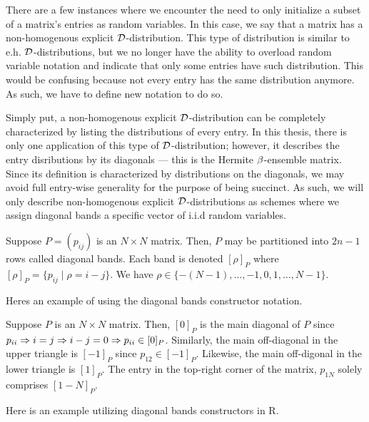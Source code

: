 
There are a few instances where we encounter the need to only initialize a subset of a matrix's entries as random variables. In this case, we say that a matrix has a non-homogenous explicit $\mathcal{D}$-distribution.
This type of distribution is similar to e.h. $\mathcal{D}$-distributions, but we no longer have the ability to overload random variable notation and indicate that only some entries have such distribution. This would be
confusing because not every entry has the same distribution anymore. As such, we have to define new notation to do so.

Simply put, a non-homogenous explicit $\mathcal{D}$-distribution can be completely characterized by listing the distributions of every entry.
In this thesis, there is only one application of this type of $\mathcal{D}$-distribution; however, it describes the entry disributions by its diagonals --- this is the Hermite $\beta$-ensemble matrix.
Since its definition is characterized by distributions on the diagonals, we may avoid full entry-wise generality for the purpose of being succinct.
As such, we will only describe non-homogenous explicit $\mathcal{D}$-distributions as schemes where we assign diagonal bands a specific vector of i.i.d random variables.

\begin{definition}
Suppose $P = (p_{ij})$ is an $N \times N$ matrix. Then, $P$ may be partitioned into $2n - 1$ rows called diagonal bands. Each band is denoted $[\rho]_P$ where $[\rho]_P = \{p_{ij} \mid \rho = i - j\}$. We have
$\rho \in \{ -(N-1), \dots, -1, 0, 1, \dots, N-1 \}$.
\end{definition}

Heres an example of using the diagonal bands constructor notation.

\begin{example}
Suppose $P$ is an $N \times N$ matrix. Then, $[0]_P$ is the main diagonal of $P$ since $p_{ii} \Rightarrow i = j \Rightarrow i - j = 0 \Rightarrow p_{ii} \in [0]_P$.
Similarly, the main off-diagonal in the upper triangle is $[-1]_P$ since $p_{12} \in [-1]_P$.
Likewise, the main off-digonal in the lower triangle is $[1]_P$. The entry in the top-right corner of the matrix, $p_{1N}$ solely comprises $[1 - N]_P$.
\end{example}

\begin{code}
Here is an example utilizing diagonal bands constructors in R.
\end{code}

